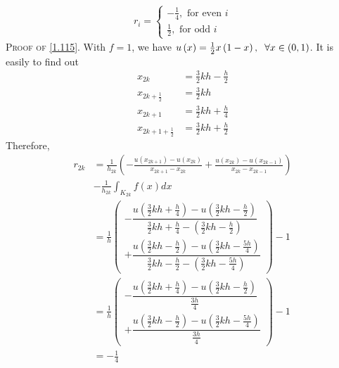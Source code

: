 \documentclass[a4paper]{article}
\numberwithin{equation}{section}
\begin{document}
\begin{align}
\label{1.115}
{r_i} = \left\{ {\begin{array}{*{20}{c}}
{ - \frac{1}{4},\mbox{ for even } i}\\
{\frac{1}{2},\mbox{ for odd } i}
\end{array}} \right.
\end{align}
\textsc{Proof of \eqref{1.115}.} With $f=1$, we have $u\left( x \right) = \frac{1}{2}x\left( {1 - x} \right),\hspace{0.2cm}\forall x \in \left( {0,1} \right)$. It is easily to find out
\begin{align}
{x_{2k}} &= \frac{3}{2}kh - \frac{h}{2}\\
{x_{2k + \frac{1}{2}}} &= \frac{3}{2}kh\\
{x_{2k + 1}} &= \frac{3}{2}kh + \frac{h}{4}\\
{x_{2k + 1 + \frac{1}{2}}} &= \frac{3}{2}kh + \frac{h}{2}
\end{align}
Therefore,
\begin{align}
{r_{2k}} &= \frac{1}{{{h_{2k}}}}\left( { - \frac{{u\left( {{x_{2k + 1}}} \right) - u\left( {{x_{2k}}} \right)}}{{{x_{2k + 1}} - {x_{2k}}}} + \frac{{u\left( {{x_{2k}}} \right) - u\left( {{x_{2k - 1}}} \right)}}{{{x_{2k}} - {x_{2k - 1}}}}} \right)\\
 &- \frac{1}{{{h_{2k}}}}\int_{{K_{2k}}} {f\left( x \right)dx} \\
 &= \frac{1}{h}\left( \begin{array}{l}
 - \dfrac{{u\left( {\frac{3}{2}kh + \frac{h}{4}} \right) - u\left( {\frac{3}{2}kh - \frac{h}{2}} \right)}}{{\frac{3}{2}kh + \frac{h}{4} - \left( {\frac{3}{2}kh - \frac{h}{2}} \right)}}\\
 + \dfrac{{u\left( {\frac{3}{2}kh - \frac{h}{2}} \right) - u\left( {\frac{3}{2}kh - \frac{{5h}}{4}} \right)}}{{\frac{3}{2}kh - \frac{h}{2} - \left( {\frac{3}{2}kh - \frac{{5h}}{4}} \right)}}
\end{array} \right) - 1\\
& = \frac{1}{h}\left( \begin{array}{l}
 - \dfrac{{u\left( {\frac{3}{2}kh + \frac{h}{4}} \right) - u\left( {\frac{3}{2}kh - \frac{h}{2}} \right)}}{{\frac{{3h}}{4}}}\\
 + \dfrac{{u\left( {\frac{3}{2}kh - \frac{h}{2}} \right) - u\left( {\frac{3}{2}kh - \frac{{5h}}{4}} \right)}}{{\frac{{3h}}{4}}}
\end{array} \right) - 1\\
 &=  - \frac{1}{4} \label{1.124}
\end{align}
\end{document}
